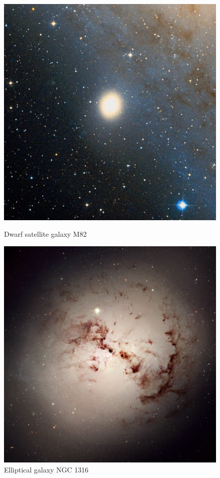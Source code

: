 \documentclass[12pt, oneside]{smuthesis}
\begin{document}
\begin{figure}[H]
	\centering
	\begin{minipage}{0.45\textwidth}
		\centering
		\includegraphics[width=0.9\linewidth]{M32}
		\caption{Dwarf satellite galaxy M82 \citep{m32}}
		\label{fig:M32}
	\end{minipage}
	\begin{minipage}{0.1\textwidth}
		\centering
	\end{minipage}
	\begin{minipage}{0.45\textwidth}
		\centering
		\includegraphics[width=0.9\linewidth]{NGC1316}
		\caption{Elliptical galaxy NGC 1316 \citep{ngc1316}}
		\label{fig:NGC1316}
	\end{minipage}
\end{figure}
\end{document}
